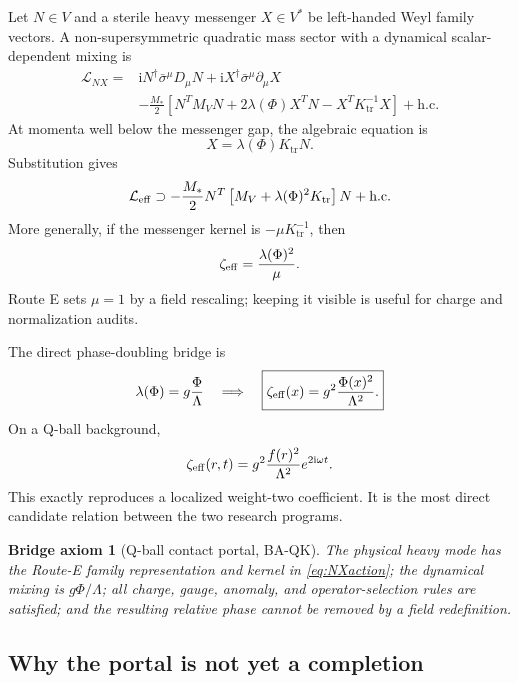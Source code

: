 \documentclass[11pt]{article}
\numberwithin{equation}{section}
\newcommand{\Ktr}{K_{\mathrm{tr}}}
\newcommand{\ii}{\mathrm i}
\newtheorem{assumption}[theorem]{Bridge axiom}
\begin{document}
Let \(N\in V\) and a sterile heavy messenger \(X\in V^*\) be left-handed Weyl
family vectors.  A non-supersymmetric quadratic mass sector with a dynamical
scalar-dependent mixing is
\begin{align}
 \mathcal L_{NX}={}&
 \ii N^\dagger\bar\sigma^\mu D_\mu N
 +\ii X^\dagger\bar\sigma^\mu\partial_\mu X\nonumber\\
 &-\frac{M_*}{2}\left[
 N^TM_VN+2\lambda(\Phi)X^TN-X^T\Ktr^{-1}X
 \right]+\text{h.c.}
 \label{eq:NXaction}
\end{align}
At momenta well below the messenger gap, the algebraic equation is
\begin{equation}
 X=\lambda(\Phi)\Ktr N.
\end{equation}
Substitution gives
\begin{equation}
 \mathcal L_{\rm eff}\supset
 -\frac{M_*}{2}N^T\left[M_V+\lambda(\Phi)^2\Ktr\right]N
 +\text{h.c.}
 \label{eq:schureff}
\end{equation}
More generally, if the messenger kernel is
\(-\mu\Ktr^{-1}\), then
\begin{equation}
 \zeta_{\rm eff}=\frac{\lambda(\Phi)^2}{\mu}.
 \label{eq:zetageneral}
\end{equation}
Route E sets \(\mu=1\) by a field rescaling; keeping it visible is useful for
charge and normalization audits.

The direct phase-doubling bridge is
\begin{equation}
 \lambda(\Phi)=g\frac\Phi\Lambda
 \quad\Longrightarrow\quad
 \boxed{\zeta_{\rm eff}(x)=g^2\frac{\Phi(x)^2}{\Lambda^2}.}
 \label{eq:zetaportal}
\end{equation}
On a Q-ball background,
\begin{equation}
 \zeta_{\rm eff}(r,t)=g^2\frac{f(r)^2}{\Lambda^2}e^{2\ii\omega t}.
 \label{eq:zetaball}
\end{equation}
This exactly reproduces a localized weight-two coefficient.  It is the most
direct candidate relation between the two research programs.

\begin{assumption}[Q-ball contact portal, BA-QK]
The physical heavy mode has the Route-E family representation and kernel in
\eqref{eq:NXaction}; the dynamical mixing is \(g\Phi/\Lambda\); all charge,
gauge, anomaly, and operator-selection rules are satisfied; and the resulting
relative phase cannot be removed by a field redefinition.
\end{assumption}

\subsection{Why the portal is not yet a completion}
\end{document}
